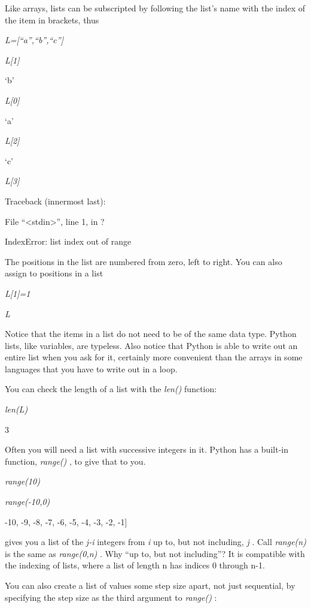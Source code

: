 Like arrays, lists can be
subscripted by following the list's name with the index of the item in
brackets, thus


\emph{L={[}``a'',``b'',``c''{]}}


\emph{L{[}1{]}}

`b'


\emph{L{[}0{]}}

`a'


\emph{L{[}2{]}}

`c'


\emph{L{[}3{]}}

Traceback (innermost last):

 File
``\textless{}stdin\textgreater{}'', line 1, in ?

IndexError: list index out of range

The positions in the list are
numbered from zero, left to right. You can also assign to positions in a
list


\emph{L{[}1{]}=1}


\emph{L}



Notice that the items in a list do
not need to be of the same data type. Python lists, like variables, are
typeless. Also notice that Python is able to write out an entire list
when you ask for it, certainly more convenient than the arrays in some
languages that you have to write out in a loop.

You can check the length of a list
with the \emph{len()} function:


\emph{len(L)}

3

Often you will need a list with
successive integers in it. Python has a built-in function,
\emph{range()} , to give that to you.


\emph{range(10)}




\emph{range(-10,0)}

-10, -9, -8, -7, -6, -5, -4, -3,
-2, -1{]}

 gives you a
list of the \emph{j-i} integers from \emph{i} up to, but not including,
\emph{j} . Call \emph{range(n)} is the same as \emph{range(0,n)} . Why
``up to, but not including''? It is compatible with the indexing of
lists, where a list of length n has indices 0 through n-1.

You can also create a list of
values some step size apart, not just sequential, by specifying the step
size as the third argument to \emph{range()} :


